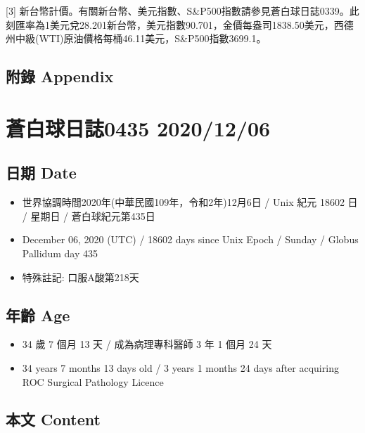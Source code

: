 \documentclass[a5paper, 10pt
]{book}
\providecommand{\tightlist}{%
  \setlength{\itemsep}{0pt}\setlength{\parskip}{0pt}}
\begin{document}
{[}3{]}
新台幣計價。有關新台幣、美元指數、S\&P500指數請參見蒼白球日誌0339。此刻匯率為1美元兌28.201新台幣，美元指數90.701，金價每盎司1838.50美元，西德州中級(WTI)原油價格每桶46.11美元，S\&P500指數3699.1。

\hypertarget{ux9644ux9304-appendix-4}{%
\subsection{附錄 Appendix}\label{ux9644ux9304-appendix-4}}

\hypertarget{ux84bcux767dux7403ux65e5ux8a8c0435-20201206}{%
\section{蒼白球日誌0435
2020/12/06}\label{ux84bcux767dux7403ux65e5ux8a8c0435-20201206}}

\hypertarget{ux65e5ux671f-date-5}{%
\subsection{日期 Date}\label{ux65e5ux671f-date-5}}

\begin{itemize}
\tightlist
\item
  世界協調時間2020年(中華民國109年，令和2年)12月6日 / Unix 紀元 18602 日
  / 星期日 / 蒼白球紀元第435日
\item
  December 06, 2020 (UTC) / 18602 days since Unix Epoch / Sunday /
  Globus Pallidum day 435
\item
  特殊註記: 口服A酸第218天
\end{itemize}

\hypertarget{ux5e74ux9f61-age-5}{%
\subsection{年齡 Age}\label{ux5e74ux9f61-age-5}}

\begin{itemize}
\tightlist
\item
  34 歲 7 個月 13 天 / 成為病理專科醫師 3 年 1 個月 24 天
\item
  34 years 7 months 13 days old / 3 years 1 months 24 days after
  acquiring ROC Surgical Pathology Licence
\end{itemize}

\hypertarget{ux672cux6587-content-5}{%
\subsection{本文 Content}\label{ux672cux6587-content-5}}
\end{document}
